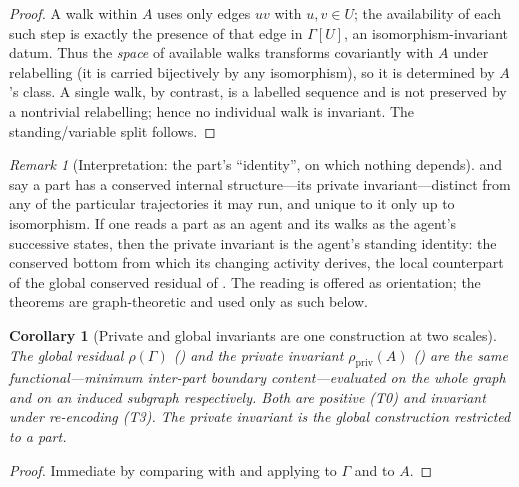 \documentclass[11pt,a4paper]{article}
\theoremstyle{thmstyle}
\newtheorem{corollary}[theorem]{Corollary}
\theoremstyle{definition}
\theoremstyle{remark}
\newtheorem{remark}[theorem]{Remark}
\newcommand{\Gph}{\Gamma}                 %
\newcommand{\Agent}{A}                    %
\newcommand{\Res}{\rho}                   %
\begin{document}
\begin{proof}
A walk within $\Agent$ uses only edges $uv$ with $u,v\in U$; the availability of
each such step is exactly the presence of that edge in $\Gph[U]$, an
isomorphism-invariant datum. Thus the \emph{space} of available walks transforms
covariantly with $\Agent$ under relabelling (it is carried bijectively by any
isomorphism), so it is determined by $\Agent$'s class. A single walk, by
contrast, is a labelled sequence and is not preserved by a nontrivial
relabelling; hence no individual walk is invariant. The standing/variable split
follows.
\end{proof}

\begin{remark}[Interpretation: the part's ``identity'', on which nothing depends]
\label{rem:character}
 and  say a part has a conserved
internal structure---its private invariant---distinct from any of the particular
trajectories it may run, and unique to it only up to isomorphism. If one reads a
part as an agent and its walks as the agent's successive states, then the private
invariant is the agent's standing identity: the conserved bottom from which its
changing activity derives, the local counterpart of the global conserved residual
of . The reading is offered as orientation; the theorems are
graph-theoretic and used only as such below.
\end{remark}

\begin{corollary}[Private and global invariants are one construction at two
scales]
\label{cor:two-scales}
The global residual $\Res(\Gph)$ \textup{(}\textup{)} and the
private invariant $\Res_{\mathrm{priv}}(\Agent)$ \textup{(}\textup{)}
are the same functional---minimum inter-part boundary content---evaluated on the
whole graph and on an induced subgraph respectively. Both are positive
\textup{(}T0\textup{)} and invariant under re-encoding \textup{(}T3\textup{)}. The
private invariant is the global construction restricted to a part.
\end{corollary}

\begin{proof}
Immediate by comparing  with  and applying
 to $\Gph$ and to $\Agent$.
\end{proof}


\end{document}
